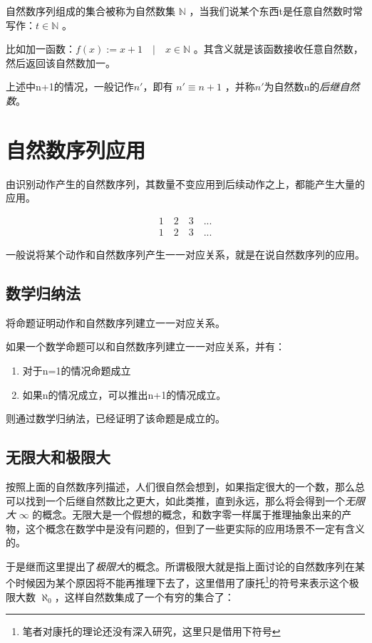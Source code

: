 \documentclass[12pt,oneside]{book}
\begin{document}
自然数序列组成的集合被称为自然数集 $ \mathbb{N} $ ，当我们说某个东西t是任意自然数时常写作：$ t \in \mathbb{N} $ 。

比如加一函数：$f(x) := x +1 \quad | \quad  x \in \mathbb{N} $ 。其含义就是该函数接收任意自然数，然后返回该自然数加一。

上述中n+1的情况，一般记作$n'$，即有 $n'\equiv n+1$ ，并称$n'$为自然数n的\emph{后继自然数}。


\section{自然数序列应用}
由识别动作产生的自然数序列，其数量不变应用到后续动作之上，都能产生大量的应用。

\begin{align*}
1 \quad 2  \quad 3 \quad ... \\
1 \quad 2  \quad 3 \quad ...
\end{align*}

一般说将某个动作和自然数序列产生一一对应关系，就是在说自然数序列的应用。


\subsection{数学归纳法}
将命题证明动作和自然数序列建立一一对应关系。

如果一个数学命题可以和自然数序列建立一一对应关系，并有：

\begin{enumerate}
\item 对于n=1的情况命题成立
\item 如果n的情况成立，可以推出n+1的情况成立。
\end{enumerate}

则通过数学归纳法，已经证明了该命题是成立的。


\subsection{无限大和极限大}
按照上面的自然数序列描述，人们很自然会想到，如果指定很大的一个数，那么总可以找到一个后继自然数比之更大，如此类推，直到永远，那么将会得到一个\emph{无限大} $\infty$ 的概念。无限大是一个假想的概念，和数字零一样属于推理抽象出来的产物，这个概念在数学中是没有问题的，但到了一些更实际的应用场景不一定有含义的。

于是继而这里提出了\emph{极限大}的概念。所谓极限大就是指上面讨论的自然数序列在某个时候因为某个原因将不能再推理下去了，这里借用了康托\footnote{笔者对康托的理论还没有深入研究，这里只是借用下符号}的符号来表示这个极限大数 $\aleph_0$，这样自然数集成了一个有穷的集合了：
\end{document}
